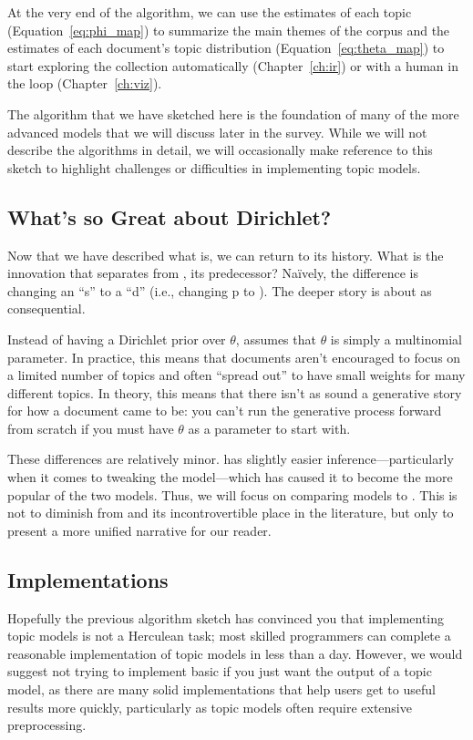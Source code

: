 At the very end of the algorithm, we can use the estimates of each topic
(Equation~\ref{eq:phi_map}) to summarize the main themes of the corpus and the
estimates of each document's topic distribution (Equation~\ref{eq:theta_map}) to
start exploring the collection automatically (Chapter~\ref{ch:ir}) or with a
human in the loop (Chapter~\ref{ch:viz}).

The algorithm that we have sketched here is the foundation of many of the more
advanced models that we will discuss later in the survey.  While we will not describe
the algorithms in detail, we will occasionally make reference to this sketch to
highlight challenges or difficulties in implementing topic models.

\subsection{What's so Great about Dirichlet?}
\label{sec:plsa-vs-lda}

Now that we have described what  is, we can return to its
history.  What is the innovation that separates  from
\plsa{}, its predecessor?  Na\"ively, the difference is changing an
``s'' to a ``d'' (i.e., changing p to ).  The deeper story is about as consequential.

Instead of having a Dirichlet prior over $\theta$, \plsa{} assumes
that $\theta$ is simply a multinomial parameter.  In practice, this
means that documents aren't encouraged to focus on a limited number of
topics and often ``spread out'' to have small weights for many
different topics.  In theory, this means that there isn't as sound a
generative story for how a document came to be: you can't run the
generative process forward from scratch if you must have $\theta$ as a
parameter to start with.

These differences are relatively minor.   has slightly easier
inference---particularly when it comes to tweaking the model---which
has caused it to become the more popular of the two models.  Thus, we
will focus on comparing models to .  This is
not to diminish from \plsa{} and its incontrovertible place in the
literature, but only to present a more unified narrative for our reader.

\subsection{Implementations}

Hopefully the previous algorithm sketch has convinced you that implementing
topic models is not a Herculean task; most skilled programmers can complete a
reasonable implementation of topic models in less than a day.  However, we would
suggest not trying to implement basic  if you just want the
output of a topic model, as there are many solid
implementations that help users get to useful results more quickly, particularly
as topic models often require extensive preprocessing.

